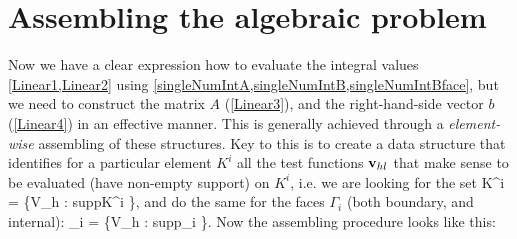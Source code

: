 \section{Assembling the algebraic problem}
Now we have a clear expression how to evaluate the integral values \cref{Linear1,Linear2} using \cref{singleNumIntA,singleNumIntB,singleNumIntBface}, but we need to construct the matrix $A$ (\cref{Linear3}), and the right-hand-side vector $b$ (\cref{Linear4}) in an effective manner.
This is generally achieved through a \textit{element-wise} assembling of these structures. Key to this is to create a data structure that identifies for a particular element $K^i$ all the test functions $\mathrm{\mathbf{v}}_{hl}$ that make sense to be evaluated (have non-empty support) on $K^i$, i.e. we are looking for the set
\be
\mrvh \lo K^i \ro = \left\{\mrvh \in V_h : supp\lo\mrvh\ro \cap K^i \neq \emptyset \right\},
\ee
and do the same for the faces $\Gamma_i$ (both boundary, and internal):
\be
\mrvh \lo \Gamma_i \ro = \left\{\mrvh \in V_h : supp\lo\mrvh\ro \cap \Gamma_i \neq \emptyset \right\}.
\ee
Now the assembling procedure looks like this:\\
